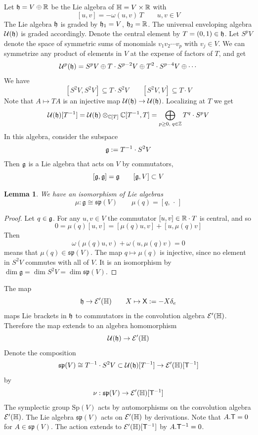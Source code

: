 \documentclass[11pt]{amsart}
\theoremstyle{plain}
\newtheorem{lemma}[theorem]{Lemma}
\theoremstyle{definition}
\theoremstyle{remark}
\begin{document}
Let $\mathfrak{h}=V\oplus {\mathbb{R}}$ be the Lie algebra of $\mathbb{H}=V\times {\mathbb{R}}$ with
\[ [u,v] = -\omega(u,v)\,T\qquad u,v\in V\]
The Lie algebra $\mathfrak{h}$ is graded by $\mathfrak{h}_1=V$, $\mathfrak{h}_2={\mathbb{R}}$.
The universal enveloping algebra ${\mathcal{U}}(\mathfrak{h})$ is graded accordingly.
Denote the central element by $T=(0,1)\in \mathfrak{h}$.
Let $S^pV$ denote the space of symmetric sums of monomials $v_1v_2\cdots v_p$ with $v_j\in V$.
We can symmetrize any product of elements in $V$ at the expense of factors of $T$, and get
\[ {\mathcal{U}}^p(\mathfrak{h}) = S^pV\oplus T\cdot S^{p-2}V\oplus T^2\cdot S^{p-4}V\oplus \cdots\]
We have
\[ [S^2V,S^2V]\subseteq T\cdot S^2V\qquad [S^2V,V]\subseteq T\cdot V\]
Note that $A\mapsto TA$ is an injective map ${\mathcal{U}}(\mathfrak{h})\to {\mathcal{U}}(\mathfrak{h})$.
Localizing at $T$ we get
\[{\mathcal{U}}(\mathfrak{h})[T^{-1}]={\mathcal{U}}(\mathfrak{h})\otimes_{{\mathbb{C}}[T]} {\mathbb{C}}[T^{-1}, T] =\bigoplus_{p\ge 0, \;q\in{\mathbb{Z}}} T^q\cdot S^pV\]
In this algebra, consider the subspace
\[\mathfrak{g}:=T^{-1}\cdot S^2V\]
Then $\mathfrak{g}$ is a Lie algebra that acts on $V$ by commutators,
\[ [\mathfrak{g},\mathfrak{g}]=\mathfrak{g}\qquad [\mathfrak{g}, V]\subset V \]

\begin{lemma}\label{lem:sp(V) action on V}
We have an isomorphism of Lie algebras
\[ \mu:\mathfrak{g}\cong \mathfrak{sp}(V)\qquad \mu(q) =  [q,\,\cdot\,] \]
\end{lemma}
\begin{proof}
Let $q\in \mathfrak{g}$.
For any $u,v\in V$ the commutator $[u,v]\in {\mathbb{R}}\cdot T$ is central, and so
\[ 0 = \mu(q)[u,v]=[\mu(q)u,v]+[u,\mu(q)v]\]
Then
\[ \omega(\mu(q)u,v)+\omega(u,\mu(q)v)=0\]
means that $\mu(q)\in \mathfrak{sp}(V)$.
The map $q\mapsto \mu(q)$ is injective, since no element in $S^2V$ commutes with all of $V$.
It is an isomorphism by $\dim \mathfrak{g} = \dim S^2V=\dim \mathfrak{sp}(V)$.
\end{proof}

The map
\[\mathfrak{h}\to {\mathcal{E}}'(\mathbb{H})\qquad
 X\mapsto \mathsf X:=-X\delta_e\]
maps Lie brackets in $\mathfrak{h}$ to
commutators in the convolution algebra ${\mathcal{E}}'(\mathbb{H})$.
Therefore the map extends to an algebra homomorphism
\[ {\mathcal{U}}(\mathfrak{h})\to {\mathcal{E}}'(\mathbb{H})\]
Denote the composition
\[ \mathfrak{sp}(V)\cong T^{-1}\cdot S^2V\subset {\mathcal{U}}(\mathfrak{h})[T^{-1}]\to {\mathcal{E}}'(\mathbb{H})[\mathsf{T}^{-1}]\]
by
\[ \nu:\mathfrak{sp}(V)\to {\mathcal{E}}'(\mathbb{H})[\mathsf{T}^{-1}]\]
The symplectic group $\mathrm{Sp}(V)$ acts by automorphisms on the convolution algebra ${\mathcal{E}}'(\mathbb{H})$.
The Lie algebra $\mathfrak{sp}(V)$ acts on ${\mathcal{E}}'(\mathbb{H})$ by derivations.
Note that $A.\mathsf{T}=0$ for $A\in\mathfrak{sp}(V)$. The action extends to ${\mathcal{E}}'(\mathbb{H})[\mathsf{T}^{-1}]$ by $A.\mathsf{T}^{-1}=0$.
\end{document}
